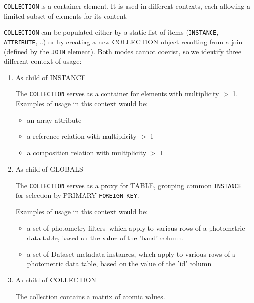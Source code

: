     \texttt{COLLECTION} is a container element.  It is used in different contexts, each allowing a limited subset of elements for its content. 
    
    \texttt{COLLECTION} can be populated either by a static list of items (\texttt{INSTANCE}, \texttt{ATTRIBUTE}, ..) or by   %
    creating a new COLLECTION object resulting from a join (defined by the \texttt{JOIN} element).
     Both  modes cannot coexist, so we identify three different context of usage: 
    
    \begin{enumerate}
    \item{As child of INSTANCE}
      
      The \texttt{COLLECTION} serves as a container for elements with multiplicity $>$ 1.\\
      Examples of usage in this context would be:
      \begin{itemize}
        \item an array attribute
        \item a reference relation with multiplicity $>$ 1
        \item a composition relation with multiplicity $>$ 1
      \end{itemize}
      
    \item{As child of GLOBALS}
          
      The \texttt{COLLECTION} serves as a proxy for TABLE, grouping common \texttt{INSTANCE}  for selection by PRIMARY \texttt{FOREIGN\_KEY}.
      
      Examples of usage in this context would be:
      \begin{itemize}
        \item a set of photometry filters, which apply to various rows of a photometric data table, based on the value of the 'band' column.
        \item a set of Dataset metadata instances, which apply to various rows of a photometric data table, based on the value of the 'id' column.
      \end{itemize}
          
    \item{As child of COLLECTION}
    
	The collection contains a matrix of  atomic values.
        
    \end{enumerate}
   
